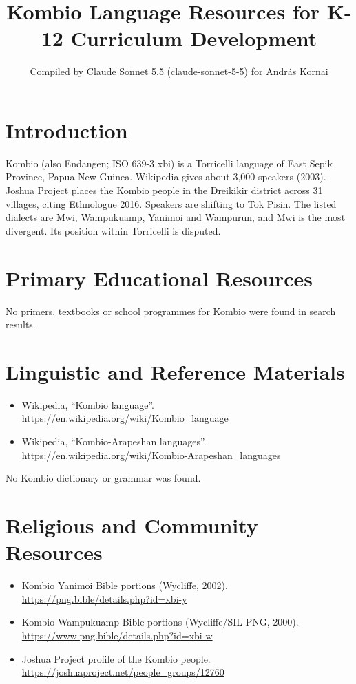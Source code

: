 \documentclass[12pt]{article}
\title{Kombio Language Resources for K-12 Curriculum Development}
\author{Compiled by Claude Sonnet 5.5 (claude-sonnet-5-5) for Andr\'as Kornai}
\date{}
\begin{document}
\maketitle

\section{Introduction}
Kombio (also Endangen; ISO 639-3 xbi) is a Torricelli language of East Sepik Province, Papua New Guinea. Wikipedia gives about 3,000 speakers (2003). Joshua Project places the Kombio people in the Dreikikir district across 31 villages, citing Ethnologue 2016. Speakers are shifting to Tok Pisin. The listed dialects are Mwi, Wampukuamp, Yanimoi and Wampurun, and Mwi is the most divergent. Its position within Torricelli is disputed.

\section{Primary Educational Resources}
No primers, textbooks or school programmes for Kombio were found in search results.

\section{Linguistic and Reference Materials}
\begin{itemize}
\item Wikipedia, ``Kombio language''. \url{https://en.wikipedia.org/wiki/Kombio_language}
\item Wikipedia, ``Kombio-Arapeshan languages''. \url{https://en.wikipedia.org/wiki/Kombio-Arapeshan_languages}
\end{itemize}
No Kombio dictionary or grammar was found.

\section{Religious and Community Resources}
\begin{itemize}
\item Kombio Yanimoi Bible portions (Wycliffe, 2002). \url{https://png.bible/details.php?id=xbi-y}
\item Kombio Wampukuamp Bible portions (Wycliffe/SIL PNG, 2000). \url{https://www.png.bible/details.php?id=xbi-w}
\item Joshua Project profile of the Kombio people. \url{https://joshuaproject.net/people_groups/12760}
\end{itemize}
\end{document}
